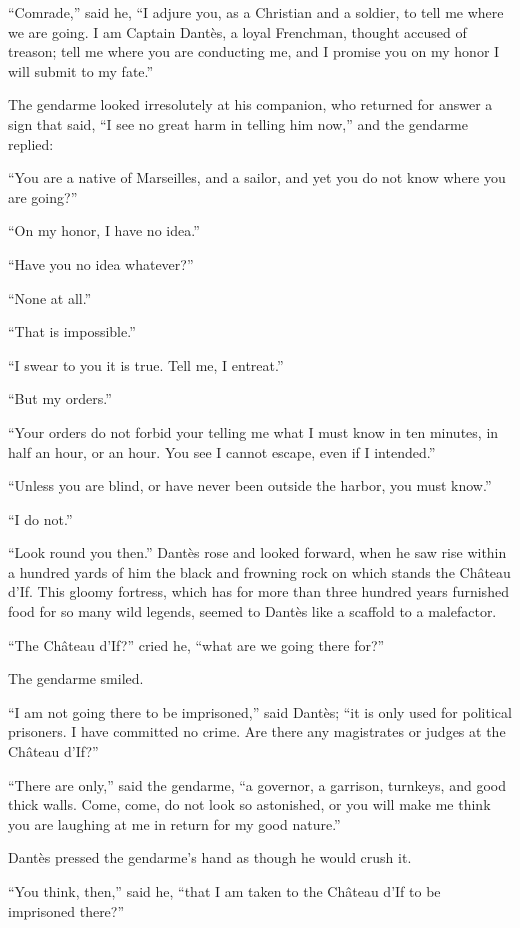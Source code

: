 “Comrade,” said he, “I adjure you, as a Christian and a soldier, to
tell me where we are going. I am Captain Dantès, a loyal Frenchman,
thought accused of treason; tell me where you are conducting me, and I
promise you on my honor I will submit to my fate.”

The gendarme looked irresolutely at his companion, who returned for
answer a sign that said, “I see no great harm in telling him now,” and
the gendarme replied:

“You are a native of Marseilles, and a sailor, and yet you do not know
where you are going?”

“On my honor, I have no idea.”

“Have you no idea whatever?”

“None at all.”

“That is impossible.”

“I swear to you it is true. Tell me, I entreat.”

“But my orders.”

“Your orders do not forbid your telling me what I must know in ten
minutes, in half an hour, or an hour. You see I cannot escape, even if
I intended.”

“Unless you are blind, or have never been outside the harbor, you must
know.”

“I do not.”

“Look round you then.” Dantès rose and looked forward, when he saw rise
within a hundred yards of him the black and frowning rock on which
stands the Château d’If. This gloomy fortress, which has for more than
three hundred years furnished food for so many wild legends, seemed to
Dantès like a scaffold to a malefactor.

“The Château d’If?” cried he, “what are we going there for?”

The gendarme smiled.

“I am not going there to be imprisoned,” said Dantès; “it is only used
for political prisoners. I have committed no crime. Are there any
magistrates or judges at the Château d’If?”

“There are only,” said the gendarme, “a governor, a garrison, turnkeys,
and good thick walls. Come, come, do not look so astonished, or you
will make me think you are laughing at me in return for my good
nature.”

Dantès pressed the gendarme’s hand as though he would crush it.

“You think, then,” said he, “that I am taken to the Château d’If to be
imprisoned there?”

